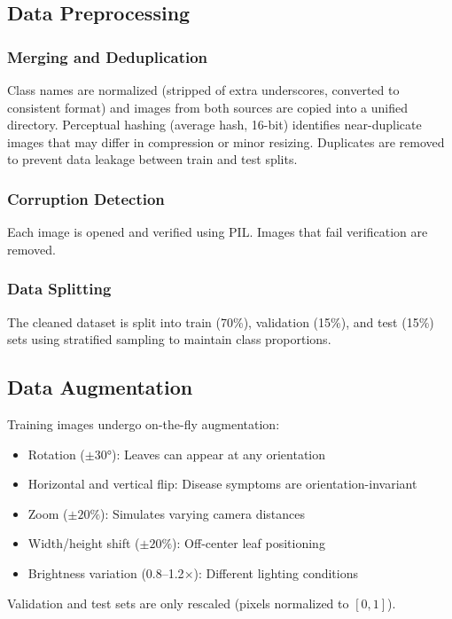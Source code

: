 \documentclass[12pt, a4paper]{article}
\begin{document}
\subsection{Data Preprocessing}

\subsubsection{Merging and Deduplication}
Class names are normalized (stripped of extra underscores, converted to consistent format) and images from both sources are copied into a unified directory. Perceptual hashing (average hash, 16-bit) identifies near-duplicate images that may differ in compression or minor resizing. Duplicates are removed to prevent data leakage between train and test splits.

\subsubsection{Corruption Detection}
Each image is opened and verified using PIL. Images that fail verification are removed.

\subsubsection{Data Splitting}
The cleaned dataset is split into train (70\%), validation (15\%), and test (15\%) sets using stratified sampling to maintain class proportions.

\subsection{Data Augmentation}

Training images undergo on-the-fly augmentation:
\begin{itemize}[noitemsep]
    \item Rotation ($\pm30°$): Leaves can appear at any orientation
    \item Horizontal and vertical flip: Disease symptoms are orientation-invariant
    \item Zoom ($\pm20\%$): Simulates varying camera distances
    \item Width/height shift ($\pm20\%$): Off-center leaf positioning
    \item Brightness variation (0.8--1.2$\times$): Different lighting conditions
\end{itemize}
Validation and test sets are only rescaled (pixels normalized to $[0, 1]$).
\end{document}
